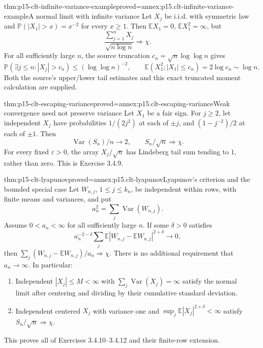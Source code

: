 \begin{hbtheorem}{thm:p15-clt-infinite-variance-example}{proved=annex:p15.clt-infinite-variance-example}{A normal limit with infinite variance}
Let \(X_j\) be i.i.d. with symmetric law and
\(\mathbb P(|X_1|>x)=x^{-2}\) for every \(x\geq1\).
Then \(\mathbb EX_1=0\), \(\mathbb EX_1^2=\infty\), but
\[
 \frac{\sum_{j=1}^nX_j}{\sqrt{n\log n}}\Rightarrow\chi.
 \]
For all sufficiently large \(n\), the source truncation
\(c_n=\sqrt n\log\log n\) gives
\[
 \mathbb P(\exists j\leq n:|X_j|>c_n)
       \leq(\log\log n)^{-2},\qquad
 \mathbb E(X_1^2;|X_1|\leq c_n)=2\log c_n\sim\log n.
 \]
Both the source's upper/lower tail estimates and this exact
truncated moment calculation are supplied.
\end{hbtheorem}

\begin{hbtheorem}{thm:p15-clt-escaping-variance}{proved=annex:p15.clt-escaping-variance}{Weak convergence need not preserve variance}
Let \(X_1\) be a fair sign. For \(j\geq2\), let independent \(X_j\)
have probabilities \(1/(2j^2)\) at each of \(\pm j\), and
\((1-j^{-2})/2\) at each of \(\pm1\). Then
\[
 \operatorname{Var}(S_n)/n\to2,\qquad
 S_n/\sqrt n\Rightarrow\chi.
 \]
For every fixed \(\varepsilon>0\), the array \(X_j/\sqrt n\)
has Lindeberg tail sum tending to \(1\), rather than zero.
This is Exercise 3.4.9.
\end{hbtheorem}

\begin{hbtheorem}{thm:p15-clt-lyapunov}{proved=annex:p15.clt-lyapunov}{Lyapunov's criterion and the bounded special case}
Let \(W_{n,j}\), \(1\leq j\leq k_n\), be independent within rows,
with finite means and variances, and put
\[
 a_n^2=\sum_j\operatorname{Var}(W_{n,j}).
 \]
Assume \(0<a_n<\infty\) for all sufficiently large \(n\).
If some \(\delta>0\) satisfies
\[
 a_n^{-2-\delta}
       \sum_j\mathbb E|W_{n,j}-\mathbb EW_{n,j}|^{2+\delta}
                         \longrightarrow0,
 \]
then \(\sum_j(W_{n,j}-\mathbb EW_{n,j})/a_n\Rightarrow\chi\).
There is no additional requirement that \(a_n\to\infty\).
In particular:
\begin{enumerate}
\item Independent \(|X_j|\leq M<\infty\) with
 \(\sum_j\operatorname{Var}(X_j)=\infty\) satisfy the normal
 limit after centering and dividing by their cumulative standard deviation.
\item Independent centered \(X_j\) with variance one and
 \(\sup_j\mathbb E|X_j|^{2+\delta}<\infty\) satisfy
 \(S_n/\sqrt n\Rightarrow\chi\).
\end{enumerate}
This proves all of Exercises 3.4.10--3.4.12 and their finite-row extension.
\end{hbtheorem}

